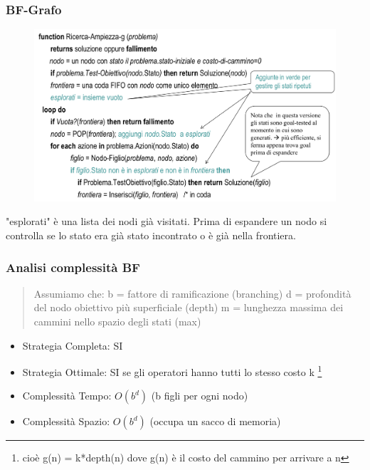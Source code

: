 \documentclass{article}
\begin{document}
\subsubsection{BF-Grafo}
\begin{figure}[H]
    \centering
    \includegraphics[scale=0.5]{Images/BFG.png}
\end{figure}
"esplorati" è una lista dei nodi già visitati. Prima di espandere un nodo si controlla se lo stato era già stato incontrato o è già nella frontiera.

\subsubsection{Analisi complessità BF}
\begin{quote}
    Assumiamo che: \newline
    b = fattore di ramificazione (branching) \newline
    d = profondità del nodo obiettivo più superficiale (depth) \newline
    m = lunghezza massima dei cammini nello spazio degli stati (max) \newline
\end{quote}

\begin{itemize}
    \item Strategia Completa: SI
    \item Strategia Ottimale: SI se gli operatori hanno tutti lo stesso costo k \footnote{cioè g(n) = k*depth(n) dove g(n) è il costo del cammino per arrivare a n}
    \item Complessità Tempo: $O(b^d)$ (b figli per ogni nodo)
    \item Complessità Spazio: $O(b^d)$ (occupa un sacco di memoria)
\end{itemize}
\clearpage
\end{document}
